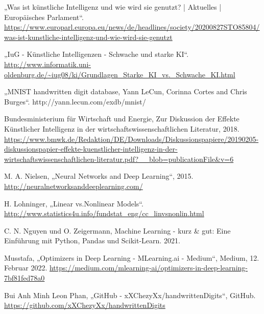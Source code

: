 \documentclass[11pt]{article}
\begin{document}
\newpage
\nolinenumbers{}
{
\renewcommand\refname{Literaturverzeichnis}
\hypersetup{linkcolor=red}
\renewcommand\UrlFont{\color{black}\normalfont}
\begin{thebibliography}{20}

    „Was ist künstliche Intelligenz und wie wird sie genutzt? | Aktuelles | Europäisches Parlament“. \url{https://www.europarl.europa.eu/news/de/headlines/society/20200827STO85804/was-ist-kunstliche-intelligenz-und-wie-wird-sie-genutzt}
    
    „IuG - Künstliche Intelligenzen - Schwache und starke KI“. \url{http://www.informatik.uni-oldenburg.de/~iug08/ki/Grundlagen_Starke_KI_vs._Schwache_KI.html}

    „MNIST handwritten digit database, Yann LeCun, Corinna Cortes and Chris Burges“. http://yann.lecun.com/exdb/mnist/

    Bundesministerium für Wirtschaft und Energie, Zur Diskussion der Effekte Künstlicher Intelligenz in der wirtschaftswissenschaftlichen Literatur, 2018.
    \url{https://www.bmwk.de/Redaktion/DE/Downloads/Diskussionspapiere/20190205-diskussionspapier-effekte-kuenstlicher-intelligenz-in-der-wirtschaftswissenschaftlichen-literatur.pdf?__blob=publicationFile&v=6}

    M. A. Nielsen, „Neural Networks and Deep Learning“, 2015. \url{http://neuralnetworksanddeeplearning.com/}

    H. Lohninger, „Linear vs.Nonlinear Models“. \url{http://www.statistics4u.info/fundstat_eng/cc_linvsnonlin.html}

    C. N. Nguyen und O. Zeigermann, Machine Learning - kurz \& gut: Eine Einführung mit Python, Pandas und Scikit-Learn. 2021.

    Musstafa, „Optimizers in Deep Learning - MLearning.ai - Medium“, Medium, 12. Februar 2022. \url{https://medium.com/mlearning-ai/optimizers-in-deep-learning-7bf81fed78a0}

    Bui Anh Minh Leon Phan, „GitHub - xXChezyXx/handwrittenDigits“, GitHub. \url{https://github.com/xXChezyXx/handwrittenDigits}


\end{thebibliography}}
\end{document}
